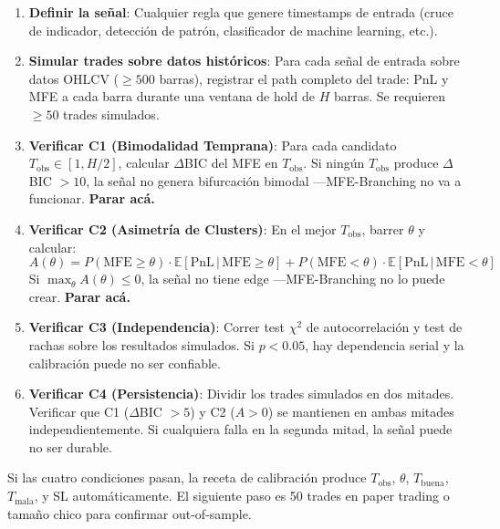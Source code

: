 \documentclass[11pt,a4paper]{article}
\begin{document}
\begin{enumerate}
    \item \textbf{Definir la señal}: Cualquier regla que genere timestamps de entrada (cruce de indicador, detección de patrón, clasificador de machine learning, etc.).

    \item \textbf{Simular trades sobre datos históricos}: Para cada señal de entrada sobre datos OHLCV ($\geq 500$ barras), registrar el path completo del trade: PnL y MFE a cada barra durante una ventana de hold de $H$ barras. Se requieren $\geq 50$ trades simulados.

    \item \textbf{Verificar C1 (Bimodalidad Temprana)}: Para cada candidato $T_{\text{obs}} \in [1, H/2]$, calcular $\Delta$BIC del MFE en $T_{\text{obs}}$. Si ningún $T_{\text{obs}}$ produce $\Delta$BIC $> 10$, la señal no genera bifurcación bimodal ---MFE-Branching no va a funcionar. \textbf{Parar acá.}

    \item \textbf{Verificar C2 (Asimetría de Clusters)}: En el mejor $T_{\text{obs}}$, barrer $\theta$ y calcular:
    \begin{equation}
        A(\theta) = P(\text{MFE} \geq \theta) \cdot \mathbb{E}[\text{PnL} \,|\, \text{MFE} \geq \theta] + P(\text{MFE} < \theta) \cdot \mathbb{E}[\text{PnL} \,|\, \text{MFE} < \theta]
    \end{equation}
    Si $\max_\theta A(\theta) \leq 0$, la señal no tiene edge ---MFE-Branching no lo puede crear. \textbf{Parar acá.}

    \item \textbf{Verificar C3 (Independencia)}: Correr test $\chi^2$ de autocorrelación y test de rachas sobre los resultados simulados. Si $p < 0.05$, hay dependencia serial y la calibración puede no ser confiable.

    \item \textbf{Verificar C4 (Persistencia)}: Dividir los trades simulados en dos mitades. Verificar que C1 ($\Delta$BIC $> 5$) y C2 ($A > 0$) se mantienen en ambas mitades independientemente. Si cualquiera falla en la segunda mitad, la señal puede no ser durable.
\end{enumerate}

Si las cuatro condiciones pasan, la receta de calibración produce $T_{\text{obs}}$, $\theta$, $T_{\text{buena}}$, $T_{\text{mala}}$, y SL automáticamente. El siguiente paso es 50 trades en paper trading o tamaño chico para confirmar out-of-sample.
\end{document}
